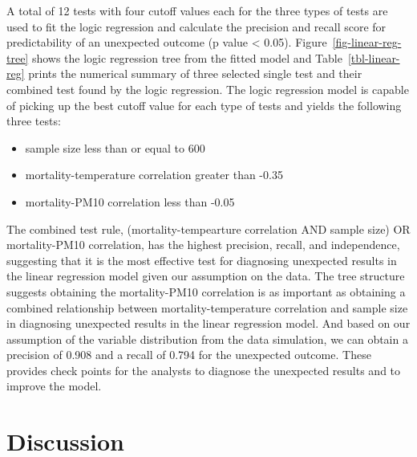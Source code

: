 \documentclass[
]{jds}
\providecommand{\tightlist}{%
  \setlength{\itemsep}{0pt}\setlength{\parskip}{0pt}}\usepackage{longtable,booktabs,array}
\begin{document}
A total of 12 tests with four cutoff values each for the three types of
tests are used to fit the logic regression and calculate the precision
and recall score for predictability of an unexpected outcome (p value
\textless{} 0.05). Figure~\ref{fig-linear-reg-tree} shows the logic
regression tree from the fitted model and Table~\ref{tbl-linear-reg}
prints the numerical summary of three selected single test and their
combined test found by the logic regression. The logic regression model
is capable of picking up the best cutoff value for each type of tests
and yields the following three tests:

\begin{itemize}
\tightlist
\item
  sample size less than or equal to 600
\item
  mortality-temperature correlation greater than -0.35
\item
  mortality-PM10 correlation less than -0.05
\end{itemize}

The combined test rule, (mortality-tempearture correlation AND sample
size) OR mortality-PM10 correlation, has the highest precision, recall,
and independence, suggesting that it is the most effective test for
diagnosing unexpected results in the linear regression model given our
assumption on the data. The tree structure suggests obtaining the
mortality-PM10 correlation is as important as obtaining a combined
relationship between mortality-temperature correlation and sample size
in diagnosing unexpected results in the linear regression model. And
based on our assumption of the variable distribution from the data
simulation, we can obtain a precision of 0.908 and a recall of 0.794 for
the unexpected outcome. These provides check points for the analysts to
diagnose the unexpected results and to improve the model.

\section{Discussion}\label{sec-discussion}
\end{document}
